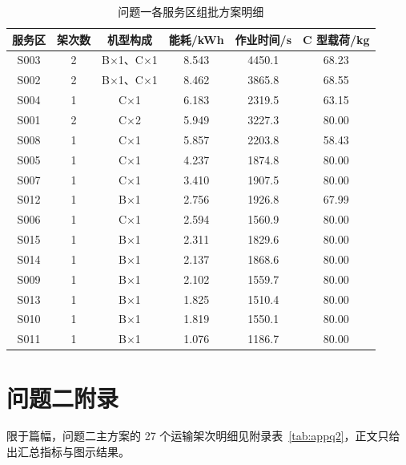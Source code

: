 \documentclass[bwprint]{gmcmthesis}
\begin{document}
\begin{appendices}
\begin{table}[H]
\centering
\caption{问题一各服务区组批方案明细}
\label{tab:appq1b}
\renewcommand\arraystretch{1.15}
\begin{tabularx}{\textwidth}{|C|C|C|C|C|C|}
  \hline
  服务区 & 架次数 & 机型构成 & 能耗/kWh & 作业时间/s & C 型载荷/kg \\
  \hline
  S003 & 2 & B×1、C×1 & 8.543 & 4450.1 & 68.23 \\
  \hline
  S002 & 2 & B×1、C×1 & 8.462 & 3865.8 & 68.55 \\
  \hline
  S004 & 1 & C×1 & 6.183 & 2319.5 & 63.15 \\
  \hline
  S001 & 2 & C×2 & 5.949 & 3227.3 & 80.00 \\
  \hline
  S008 & 1 & C×1 & 5.857 & 2203.8 & 58.43 \\
  \hline
  S005 & 1 & C×1 & 4.237 & 1874.8 & 80.00 \\
  \hline
  S007 & 1 & C×1 & 3.410 & 1907.5 & 80.00 \\
  \hline
  S012 & 1 & B×1 & 2.756 & 1926.8 & 67.99 \\
  \hline
  S006 & 1 & C×1 & 2.594 & 1560.9 & 80.00 \\
  \hline
  S015 & 1 & B×1 & 2.311 & 1829.6 & 80.00 \\
  \hline
  S014 & 1 & B×1 & 2.137 & 1868.6 & 80.00 \\
  \hline
  S009 & 1 & B×1 & 2.102 & 1559.7 & 80.00 \\
  \hline
  S013 & 1 & B×1 & 1.825 & 1510.4 & 80.00 \\
  \hline
  S010 & 1 & B×1 & 1.819 & 1550.1 & 80.00 \\
  \hline
  S011 & 1 & B×1 & 1.076 & 1186.7 & 80.00 \\
  \hline
\end{tabularx}
\end{table}

\section{问题二附录}

限于篇幅，问题二主方案的 27 个运输架次明细见附录表~\ref{tab:appq2}，正文只给出汇总指标与图示结果。


\end{appendices}
\end{document}
